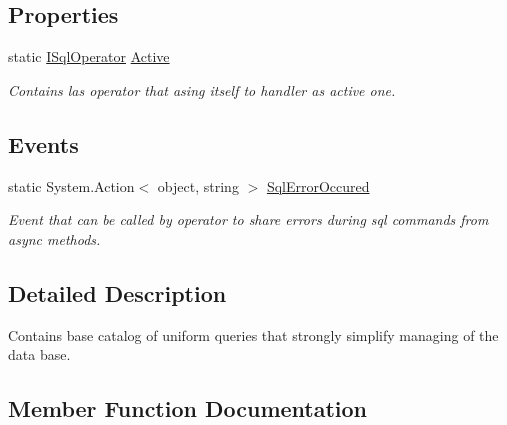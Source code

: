 \subsection*{Properties}
\begin{DoxyCompactItemize}
\item 
static \mbox{\hyperlink{interface_uniform_data_operator_1_1_sql_1_1_i_sql_operator}{I\+Sql\+Operator}} \mbox{\hyperlink{class_uniform_data_operator_1_1_sql_1_1_sql_operator_handler_aa96eb9fd201700acbf53954599fec534}{Active}}
\begin{DoxyCompactList}\small\item\em Contains las operator that asing itself to handler as active one. \end{DoxyCompactList}\end{DoxyCompactItemize}
\subsection*{Events}
\begin{DoxyCompactItemize}
\item 
static System.\+Action$<$ object, string $>$ \mbox{\hyperlink{class_uniform_data_operator_1_1_sql_1_1_sql_operator_handler_ab6cf915e80cf89b3e6eb14bf48a19185}{Sql\+Error\+Occured}}
\begin{DoxyCompactList}\small\item\em Event that can be called by operator to share errors during sql commands from async methods. \end{DoxyCompactList}\end{DoxyCompactItemize}


\subsection{Detailed Description}
Contains base catalog of uniform queries that strongly simplify managing of the data base. 



\subsection{Member Function Documentation}
\mbox{\label{class_uniform_data_operator_1_1_sql_1_1_sql_operator_handler_ab2de5b9d7f8e8e67b518cf39c7e6f7a5}} 
